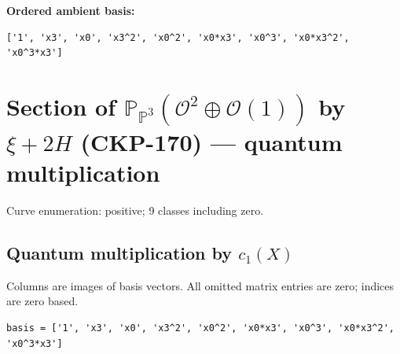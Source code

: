 \documentclass[10pt,a4paper]{article}
\begin{document}
\textbf{Ordered ambient basis:}
\begin{lstlisting}
['1', 'x3', 'x0', 'x3^2', 'x0^2', 'x0*x3', 'x0^3', 'x0*x3^2', 'x0^3*x3']
\end{lstlisting}

\clearpage\section*{Section of $\mathbb P_{\mathbb P^{3}}(\mathcal O^{2}\oplus \mathcal O(1))$ by $\xi +2H$ (CKP-170) --- quantum multiplication}

Curve enumeration: positive; 9 classes including zero.
\subsection*{Quantum multiplication by $c_1(X)$}
Columns are images of basis vectors. All omitted matrix entries are zero; indices are zero based.

\begin{lstlisting}
basis = ['1', 'x3', 'x0', 'x3^2', 'x0^2', 'x0*x3', 'x0^3', 'x0*x3^2', 'x0^3*x3']
\end{lstlisting}
\end{document}
